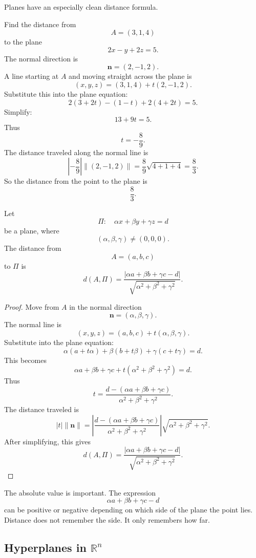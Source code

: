 Planes have an especially clean distance formula.

\begin{example}
Find the distance from
\[
    A=(3,1,4)
\]
to the plane
\[
    2x-y+2z=5.
\]
The normal direction is
\[
    \mathbf n=(2,-1,2).
\]
A line starting at \(A\) and moving straight across the plane is
\[
    (x,y,z)=(3,1,4)+t(2,-1,2).
\]
Substitute this into the plane equation:
\[
    2(3+2t)-(1-t)+2(4+2t)=5.
\]
Simplify:
\[
    13+9t=5.
\]
Thus
\[
    t=-\frac{8}{9}.
\]
The distance traveled along the normal line is
\[
    \left|-\frac{8}{9}\right|\|(2,-1,2)\|
    =
    \frac{8}{9}\sqrt{4+1+4}
    =
    \frac{8}{3}.
\]
So the distance from the point to the plane is
\[
    \frac83.
\]
\end{example}

\begin{theorem}
Let
\[
    \Pi:\quad \alpha x+\beta y+\gamma z=d
\]
be a plane, where
\[
    (\alpha,\beta,\gamma)\neq (0,0,0).
\]
The distance from
\[
    A=(a,b,c)
\]
to \(\Pi\) is
\[
    \boxed{
    d(A,\Pi)
    =
    \frac{|\alpha a+\beta b+\gamma c-d|}
         {\sqrt{\alpha^2+\beta^2+\gamma^2}}.
    }
\]
\end{theorem}

\begin{proof}
Move from \(A\) in the normal direction
\[
    \mathbf n=(\alpha,\beta,\gamma).
\]
The normal line is
\[
    (x,y,z)=(a,b,c)+t(\alpha,\beta,\gamma).
\]
Substitute into the plane equation:
\[
    \alpha(a+t\alpha)+\beta(b+t\beta)+\gamma(c+t\gamma)=d.
\]
This becomes
\[
    \alpha a+\beta b+\gamma c
    +
    t(\alpha^2+\beta^2+\gamma^2)
    =
    d.
\]
Thus
\[
    t=
    \frac{d-(\alpha a+\beta b+\gamma c)}
         {\alpha^2+\beta^2+\gamma^2}.
\]
The distance traveled is
\[
    |t|\|\mathbf n\|
    =
    \left|
    \frac{d-(\alpha a+\beta b+\gamma c)}
         {\alpha^2+\beta^2+\gamma^2}
    \right|
    \sqrt{\alpha^2+\beta^2+\gamma^2}.
\]
After simplifying, this gives
\[
    d(A,\Pi)
    =
    \frac{|\alpha a+\beta b+\gamma c-d|}
         {\sqrt{\alpha^2+\beta^2+\gamma^2}}.
\]
\end{proof}

The absolute value is important.  The expression
\[
    \alpha a+\beta b+\gamma c-d
\]
can be positive or negative depending on which side of the plane the point lies.  Distance
does not remember the side.  It only remembers how far.

\subsection{Hyperplanes in \(\mathbb R^n\)}

